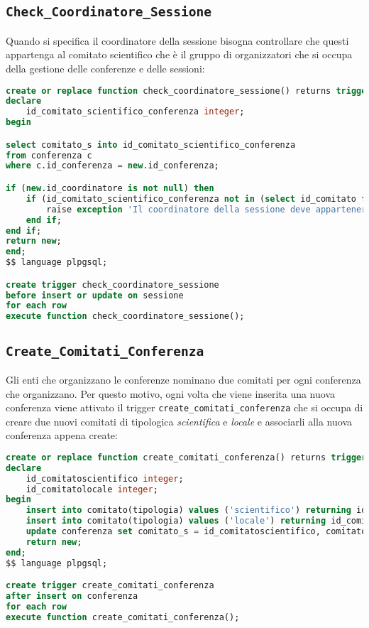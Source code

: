 \subsection{\texttt{Check\_Coordinatore\_Sessione}}
Quando si specifica il coordinatore della sessione bisogna controllare che questi appartenga al comitato scientifico che è il gruppo di organizzatori che si occupa della gestione delle conferenze e delle sessioni:
\begin{lstlisting}[caption={check\_coordinatore\_sessione}, language=sql, style=mystyle]
create or replace function check_coordinatore_sessione() returns trigger as $$
declare 
    id_comitato_scientifico_conferenza integer;
begin

select comitato_s into id_comitato_scientifico_conferenza
from conferenza c
where c.id_conferenza = new.id_conferenza;

if (new.id_coordinatore is not null) then
    if (id_comitato_scientifico_conferenza not in (select id_comitato from organizzatore_comitato where id_organizzatore = new.id_coordinatore))  then
        raise exception 'Il coordinatore della sessione deve appartenere al comitato scientifico della conferenza';
    end if;
end if;
return new;
end;
$$ language plpgsql;

create trigger check_coordinatore_sessione
before insert or update on sessione
for each row
execute function check_coordinatore_sessione();
\end{lstlisting}
\subsection{\texttt{Create\_Comitati\_Conferenza}}
Gli enti che organizzano le conferenze nominano due comitati per ogni conferenza che organizzano. Per questo motivo, ogni volta che viene inserita una nuova conferenza viene attivato il trigger \texttt{create\_comitati\_conferenza} che si occupa di creare due nuovi comitati di tipologica \textit{scientifica} e \textit{locale} e associarli alla nuova conferenza appena create:
\begin{lstlisting}[language=SQL, style=mystyle, caption={\texttt{create\_comitati\_conferenza}}]
create or replace function create_comitati_conferenza() returns trigger as $$
declare 
    id_comitatoscientifico integer;
    id_comitatolocale integer;
begin
    insert into comitato(tipologia) values ('scientifico') returning id_comitato into id_comitatoscientifico;
    insert into comitato(tipologia) values ('locale') returning id_comitato into id_comitatolocale;
    update conferenza set comitato_s = id_comitatoscientifico, comitato_l = id_comitatolocale where id_conferenza = new.id_conferenza;
    return new;
end;
$$ language plpgsql;

create trigger create_comitati_conferenza
after insert on conferenza
for each row
execute function create_comitati_conferenza();
\end{lstlisting}
